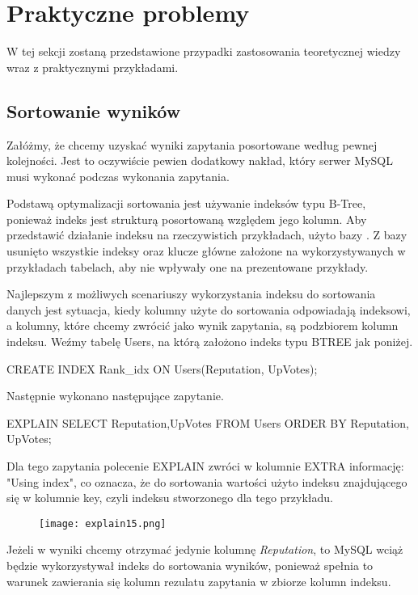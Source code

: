 \section{Praktyczne problemy}
W tej sekcji zostaną przedstawione przypadki zastosowania teoretycznej wiedzy wraz z praktycznymi przykładami.



\subsection{Sortowanie wyników}
Załóżmy, że chcemy uzyskać wyniki zapytania posortowane według pewnej kolejności. Jest to oczywiście pewien dodatkowy nakład, który serwer MySQL musi wykonać podczas wykonania zapytania.

Podstawą optymalizacji sortowania jest używanie indeksów typu B-Tree, ponieważ indeks jest strukturą posortowaną względem jego kolumn. Aby przedstawić działanie indeksu na rzeczywistich przykładach, użyto bazy . Z bazy usunięto wszystkie indeksy oraz klucze główne założone na wykorzystywanych w przykładach tabelach, aby nie wpływały one na prezentowane przykłady.


Najlepszym z możliwych scenariuszy wykorzystania indeksu do sortowania danych jest sytuacja, kiedy kolumny użyte do sortowania odpowiadają indeksowi, a kolumny, które chcemy zwrócić jako wynik zapytania, są podzbiorem kolumn indeksu.
Weźmy tabelę Users, na którą założono indeks typu BTREE jak poniżej.

\begin{spverbatim}
	CREATE INDEX Rank_idx ON Users(Reputation, UpVotes);
\end{spverbatim}
\bigskip
Następnie wykonano następujące zapytanie.
\begin{spverbatim}
	EXPLAIN SELECT Reputation,UpVotes FROM Users ORDER BY Reputation, UpVotes;
\end{spverbatim}
\bigskip
Dla tego zapytania polecenie EXPLAIN zwróci w kolumnie EXTRA informację: "Using index", co oznacza, że do sortowania wartości użyto indeksu znajdującego się w kolumnie key, czyli indeksu stworzonego dla tego przykładu.

\begin{figure}[h!]
	\texttt{[image: explain15.png]} 
\end{figure}
Jeżeli w wyniki chcemy otrzymać jedynie kolumnę \textit{Reputation}, to MySQL wciąż będzie wykorzystywał indeks do sortowania wyników, ponieważ spełnia to warunek zawierania się kolumn rezulatu zapytania w zbiorze kolumn indeksu. 

